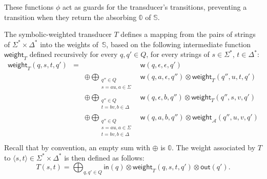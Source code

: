 \documentclass[a4paper,11pt]{article}
\def\<#1>{\langle #1 \rangle}
\newcommand{\A}{\mathcal{A}}
\newcommand{\Semiring}{\mathbb{S}}
\newcommand{\zero}{\mathbb{0}}
\def\weight{\mathsf{weight}}
\def\wei{\mathsf{w}}
\begin{document}
These functions $\phi$ act as guards for the transducer's transitions, 
preventing a transition when they return the absorbing $\zero$ of $\Semiring$.

The symbolic-weighted transducer $T$ defines a mapping 
from the pairs of strings of $\Sigma^* \times \Delta^*$ 
into the weights of~$\Semiring$,
based on the following intermediate function $\weight_T$
defined recursively for every $q, q' \in Q$, 
for every strings of $s \in \Sigma^*$, $t \in \Delta^*$:
\[
\begin{array}{rccl}
\weight_T(q, s, t, q') & = & & \wei(q, \epsilon, \epsilon, q')\\
 & & \oplus \displaystyle\bigoplus_{\begin{array}{c}
                                      \scriptstyle q'' \in Q\\[-2pt]
                                      \scriptstyle s = au, a \in \Sigma
                                      \end{array}} &
     \wei(q, a, \epsilon, q'') \otimes \weight_T(q'', u, t, q')\\
 & & \oplus \displaystyle\bigoplus_{\begin{array}{c}
                                    \scriptstyle q'' \in Q\\[-2pt]
                                    \scriptstyle t = bv, b \in \Delta
                                    \end{array}} &
      \wei(q, \epsilon, b, q'') \otimes \weight_T(q'', s, v, q')\\ 
      & & \oplus \displaystyle\bigoplus_{\begin{array}{c}
                                         \scriptstyle q'' \in Q\\[-2pt]
                                         \scriptstyle s = au, a \in \Sigma\\[-2pt]
                                         \scriptstyle t = bv, b \in \Delta
                                         \end{array}} &
      \wei(q, a, b, q'') \otimes \weight_\A(q'', u, v, q')\\ 
\end{array}
\]
Recall that by convention, an empty sum with $\oplus$ is $\zero$. 
%
\noindent
The weight associated by $T$ to  $\< s, t> \in \Sigma^* \times \Delta^*$
is then defined as follows: 
\[
T(s, t)  = 
\displaystyle\bigoplus_{q, q' \in Q} \mathsf{in}(q) 
\mathop{\otimes} \weight_T(q, s, t, q') \mathop{\otimes} \mathsf{out}(q').
\]
\end{document}
